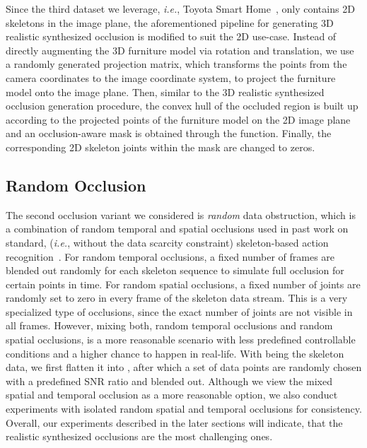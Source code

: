 \documentclass[lettersize,journal]{IEEEtran}
\begin{document}
Since the third dataset we leverage, \textit{i.e.}, Toyota Smart Home~\cite{Das_2019_ICCV}, only contains 2D skeletons in the image plane, the aforementioned pipeline for generating 3D realistic synthesized occlusion is modified to suit the 2D use-case.
Instead of directly augmenting the 3D furniture model via rotation and translation, we use a randomly generated projection matrix, which transforms the points from the camera coordinates to the image coordinate system, to project the furniture model onto the image plane. 
Then, similar to the 3D realistic synthesized occlusion generation procedure, the convex hull of the occluded region is built up according to the projected points of the furniture model on the 2D image plane and an occlusion-aware mask is obtained through the  function. 
Finally, the corresponding 2D skeleton joints within the mask are changed to zeros.

\subsection{Random Occlusion}
\label{benchmark:random}

The second occlusion variant we considered is \textit{random} data obstruction, which is a combination of random temporal and spatial occlusions used in past work on standard, (\textit{i.e.}, without the data scarcity constraint) skeleton-based action recognition~\cite{song2019richly,song2020richly}.
For random temporal occlusions, a fixed number of frames are blended out randomly for each skeleton sequence to simulate full occlusion for certain points in time.
For random spatial occlusions, a fixed number of joints are  randomly set to zero in every frame of the skeleton data stream. This is a very specialized type of occlusions, since the exact number of joints are not visible in all frames.
However, mixing both, random temporal occlusions and random spatial occlusions, is a more reasonable scenario with less predefined controllable conditions and a higher chance to happen in real-life.
With  being the skeleton data, we first flatten it into , after which a set of data points  are randomly chosen with a predefined SNR ratio  and blended out.
Although we view the mixed spatial and temporal occlusion as a more reasonable option, we also conduct experiments with isolated random spatial and temporal occlusions for consistency.
Overall, our experiments described in the later sections will indicate, that the realistic synthesized occlusions are the most challenging ones.
\end{document}
